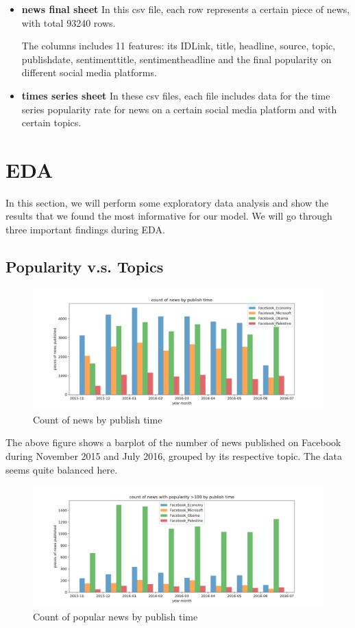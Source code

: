 \documentclass{article}
\begin{document}
\begin{itemize}
\item \textbf{news final sheet}
In this csv file, each row represents a certain piece of news, with total 93240 rows.\par
The columns includes 11 features: its IDLink, title, headline, source, topic, publishdate, sentimenttitle, sentimentheadline and the final popularity on different social media platforms.
\item \textbf{times series sheet}
In these csv files, each file includes data for the time series popularity rate for news on a certain social media platform and with certain topics.  

\end{itemize}

\section{EDA}
In this section, we will perform some exploratory data analysis and show the results that we found the most informative for our model. We will go through three important findings during EDA.

\subsection{Popularity v.s. Topics}
 
\begin{figure}[H]
\centering
\includegraphics[scale=0.17]{"count of news by publish time"}
\caption{Count of news by publish time}
\end{figure}

The above figure shows a barplot of the number of news published on Facebook during November 2015 and July 2016, grouped by its respective topic. The data seems quite balanced here.

\begin{figure}[H]
\centering
\includegraphics[scale=0.17]{"count of news with popularity larger than 100 by publish time"}
\caption{Count of popular news by publish time}
\end{figure}
\end{document}
